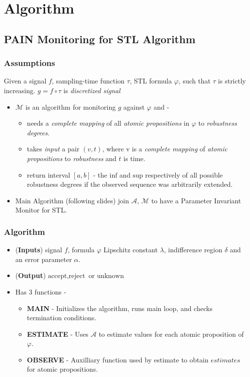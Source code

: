 \documentclass{beamer}
\newcommand{\accept}{\text{accept}}
\newcommand{\reject}{\text{reject}}
\newcommand{\unknown}{\text{unknown}}
\newcommand{\M}{\mathcal{M}}
\newcommand{\A}{\mathcal{A}}
\begin{document}
\section{Algorithm}
\subsection{PAIN Monitoring for STL Algorithm}
\begin{frame}
    \frametitle{Assumptions}
    Given a signal $f$, sampling-time function $\tau$,
    STL formula $\varphi$, such that $\tau$ is strictly
    increasing. $g = f \circ \tau$ is \textit{discretized signal}
    \begin{itemize}
        \item $\M$ is an algorithm for monitoring $g$ against $\varphi$ and -
        \begin{itemize}
            \item needs a \textit{complete mapping} of all \textit{atomic propositions}
            in $\varphi$ to \textit{robustness degrees}.
            \item takes \textit{input} a pair $(v, t)$,
            where v is a \textit{complete mapping} of \textit{atomic propositions}
            to \textit{robustness} and $t$ is time.
        \item return interval $[a, b]$ - the $\text{inf}$ and $\text{sup}$
            respectively of all possible robustness degrees if
            the observed sequence was arbitrarily extended.
        \end{itemize}
        \item Main Algorithm (following slides) join
            $\A$, $\M$ to have a Parameter Invariant Monitor
            for STL.
    \end{itemize}
\end{frame}

\begin{frame}
    \frametitle{Algorithm}
    \begin{itemize}
        \item (\textbf{Inputs}) signal $f$, formula $\varphi$
    Lipschitz constant $\lambda$, indifference region $\delta$ and an error parameter $\alpha$.
        \item (\textbf{Output}) $\accept, \reject$ or $\unknown$
        \item Has 3 functions -
            \begin{itemize}
                \item \textbf{MAIN} - Initializes the algorithm,
                    runs main loop, and checks termination conditions.
                \item \textbf{ESTIMATE} - Uses $\A$ to
                    estimate values for each atomic proposition of $\varphi$.
                \item \textbf{OBSERVE} - Auxilliary function used
                    by estimate to obtain $\textit{estimates}$ for
                    atomic propositions.
            \end{itemize}
    \end{itemize}
\end{frame}
\end{document}
